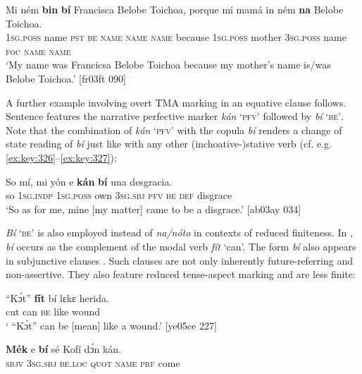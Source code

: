 \ea%
    \label{ex:key:773}
    \gll Mi    ném    \textbf{bin}  \textbf{bí} Francisca  Belobe  Toichoa,    porque
mi    mamá  in    ném    \textbf{na} Belobe  Toichoa.\\
\textsc{1sg.poss}  name  \textsc{pst}  \textsc{be}  \textsc{name}    \textsc{name}  \textsc{name}    because
\textsc{1sg.poss}  mother  \textsc{3sg.poss}  name  \textsc{foc}  \textsc{name}  \textsc{name}\\

\glt ‘My name was Francicsa Belobe Toichoa because my mother’s name 
is/was Belobe Toichoa.’ [fr03ft 090]
\z

A further example involving overt TMA marking in an equative clause follows. Sentence  features the narrative perfective marker \textit{kán} ‘\textsc{pfv}’ followed by \textit{bí} ‘\textsc{be’}. Note that the combination of\textit{ kán} ‘\textsc{pfv}’ with the copula \textit{bí} renders a change of state reading of \textit{bí} just like with any other (inchoative-)stative verb (cf. e.g. \ref{ex:key:326}–\ref{ex:key:327}): 


\ea%
    \label{ex:key:774}
    \gll So  mí,    mi    yón     e    \textbf{kán}  \textbf{bí}  una  desgracia.\\
so  \textsc{1sg.indp}  \textsc{1sg.poss}  own    \textsc{3sg.sbj}  \textsc{pfv}  \textsc{be}  \textsc{def}  disgrace\\

\glt ‘So as for me, mine [my matter] came to be a disgrace.’ [ab03ay 034]
\z

\textit{Bí} \textsc{‘be’} is also employed instead of \textit{na}\textit{\textup{/}}\textit{nóto} in contexts of reduced finiteness. In , \textit{bí} occurs as the complement of the modal verb \textit{fít} ‘can’. The form \textit{bí} also appears in subjunctive clauses . Such clauses are not only inherently future-referring and non-assertive. They also feature reduced tense-aspect marking and are less finite:


\ea%
    \label{ex:key:775}
    \gll “Kɔ́t”    \textbf{fít}  bí  lɛkɛ    herida.\\
\phantom{“}cut    can  \textsc{be}  like    wound\\

\glt ` “Kɔ́t” can be [mean] like a wound.’ [ye05ce 227]
\z


\ea%
    \label{ex:key:776}
    \gll \textbf{Mék}    e    \textbf{bí}    sé    Kofí    dɔ́n    kán.\\
\textsc{sbjv}    \textsc{3sg.sbj}  \textsc{be.loc}  \textsc{quot}    \textsc{name}  \textsc{prf}    come\\

